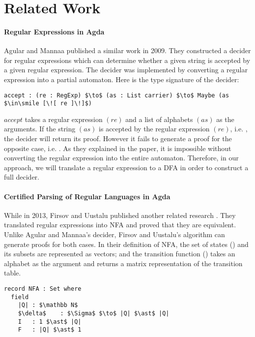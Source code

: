 \section{Related Work}
\paragraph{Regular Expressions in Agda} Agular and Mannaa published a
similar work \cite{agular2009} in 2009. They constructed a decider for
regular expressions which can determine whether
a given string is accepted by a given regular expression. The decider
was implemented by converting a regular expression into a
partial automaton. Here is the type signature of the decider: 
\begin{lstlisting}[mathescape=true,xleftmargin=.05\textwidth]
accept : (re : RegExp) $\to$ (as : List carrier) $\to$ Maybe (as $\in\smile [\![ re ]\!]$)
\end{lstlisting}
\par \(accept\) takes a regular expression \((re)\) and a list of
alphabets \((as)\) as the arguments. If the string \((as)\) is accepted
by the regular expression \((re)\), i.e. , the decider will return its proof. However it fails to generate a
proof for the opposite case, i.e. . As they
explained in the paper, it is impossible without converting the regular expression into
the entire automaton. Therefore, in our approach, we will translate a regular
expression to a DFA in order to construct a full decider. 


\paragraph{Certified Parsing of Regular Languages in Agda} While in 2013, Firsov and Uustalu published another related
research \cite{firsov2013}. They translated regular expressions
into NFA and proved that they are equivalent. Unlike Agular and Mannaa's decider, Firsov and Uustalu's
algorithm can generate proofs for both cases. In their definition of NFA, the set of states
() and its subsets are represented as vectors; and the transition function
(\mb{\delta}) takes an alphabet as the argument and returns a matrix
representation of the transition table. 
\begin{lstlisting}[mathescape=true,xleftmargin=.3\textwidth]
record NFA : Set where
  field
    |Q| : $\mathbb N$
    $\delta$    : $\Sigma$ $\to$ |Q| $\ast$ |Q|
    I   : 1 $\ast$ |Q|
    F   : |Q| $\ast$ 1
\end{lstlisting}

